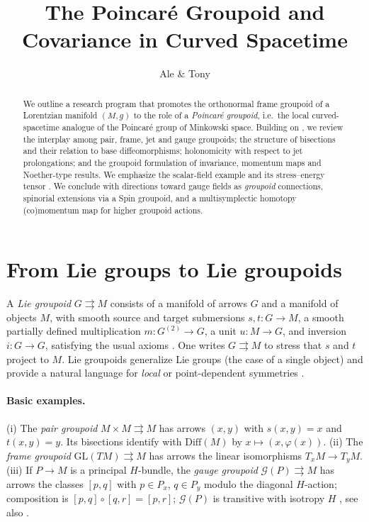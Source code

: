 \documentclass[11pt]{article}
\title{The Poincar\'e Groupoid and Covariance in Curved Spacetime}
\author{Ale \& Tony}
\date{ }
\newcommand{\Diff}{\mathrm{Diff}}
\newcommand{\GL}{\mathrm{GL}}
\begin{document}
\maketitle

\begin{abstract}
We outline a research program that promotes the orthonormal frame groupoid of a Lorentzian manifold $(M,g)$ to the role of a \emph{Poincar\'e groupoid}, i.e.\ the local curved-spacetime analogue of the Poincar\'e group of Minkowski space. Building on \citep{CostaA2015,CostaB2018}, we review the interplay among pair, frame, jet and gauge groupoids; the structure of bisections and their relation to base diffeomorphisms; holonomicity with respect to jet prolongations; and the groupoid formulation of invariance, momentum maps and Noether-type results. We emphasize the scalar-field example and its stress--energy tensor \citep[Eq.~(158)]{CostaA2015}. We conclude with directions toward gauge fields as \emph{groupoid} connections, spinorial extensions via a Spin groupoid, and a multisymplectic homotopy (co)momentum map for higher groupoid actions.
\end{abstract}

\section{From Lie groups to Lie groupoids}
A \emph{Lie groupoid} $G\rightrightarrows M$ consists of a manifold of arrows $G$ and a manifold of objects $M$, with smooth source and target submersions $s,t:G\to M$, a smooth partially defined multiplication $m:G^{(2)}\to G$, a unit $u:M\to G$, and inversion $i:G\to G$, satisfying the usual axioms \citep[Def.~\S{}Definition and basic concepts]{WikipediaLieGroupoid}. One writes $G\rightrightarrows M$ to stress that $s$ and $t$ project to $M$. Lie groupoids generalize Lie groups (the case of a single object) and provide a natural language for \emph{local} or point-dependent symmetries \citep{WikipediaLieGroupoid}.

\paragraph{Basic examples.}
(i) The \emph{pair groupoid} $M\times M\rightrightarrows M$ has arrows $(x,y)$ with $s(x,y)=x$ and $t(x,y)=y$. Its bisections identify with $\Diff(M)$ by $x\mapsto (x,\varphi(x))$. 
(ii) The \emph{frame groupoid} $\GL(TM)\rightrightarrows M$ has arrows the linear isomorphisms $T_xM\to T_yM$. 
(iii) If $P\to M$ is a principal $H$-bundle, the \emph{gauge groupoid} $\mathcal{G}(P)\rightrightarrows M$ has arrows the classes $[p,q]$ with $p\in P_x$, $q\in P_y$ modulo the diagonal $H$-action; composition is $[p,q]\circ [q,r]=[p,r]$; $\mathcal{G}(P)$ is transitive with isotropy $H$ \citep[\S{}Transitive groupoids]{WikipediaLieGroupoid}, see also \citep{nlabGaugeGroup}.
\end{document}
